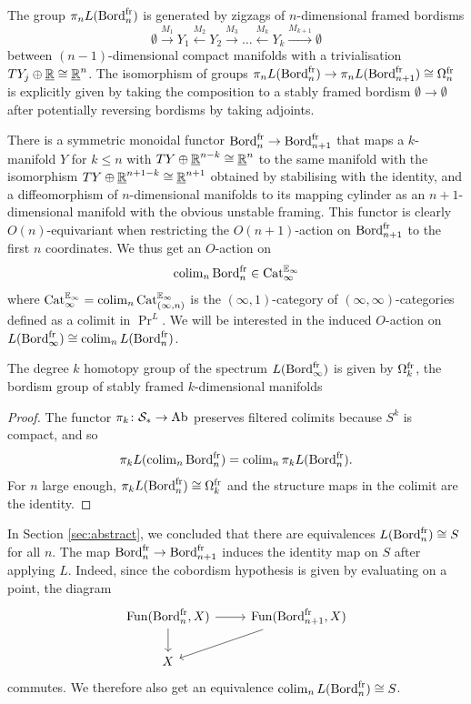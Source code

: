\documentclass{amsart}
\begin{document}
\begin{example}
    The group $\pi_n L(\operatorname{Bord}_n^{\mathrm{fr}})$ is generated by zigzags of $n$-dimensional framed bordisms
    \[
    \emptyset \xrightarrow{M_1} Y_1 \xleftarrow{M_2} Y_2 \xrightarrow{M_3} \dots \xleftarrow{M_{k}} Y_{k} \xrightarrow{M_{k+1}} \emptyset
    \]
    between $(n-1)$-dimensional compact manifolds with a trivialisation $TY_j \oplus \underline{\mathbb{R}} \cong \underline{\mathbb{R}}^n$.
    The isomorphism of groups $\pi_n L(\operatorname{Bord}_n^{\mathrm{fr}}) \to \pi_n L(\operatorname{Bord}_{n+1}^{\mathrm{fr}}) \cong \Omega_n^{\mathrm{fr}}$ is explicitly given by taking the composition to a stably framed bordism $\emptyset \to \emptyset$ after potentially reversing bordisms by taking adjoints.
\end{example}

There is a symmetric monoidal functor $\operatorname{Bord}^{\mathrm{fr}}_n \to \operatorname{Bord}^{\mathrm{fr}}_{n+1}$ that maps a $k$-manifold $Y$ for $k\leq n$ with $TY \oplus \underline{\mathbb{R}}^{n-k} \cong \underline{\mathbb{R}}^n$ to the same manifold with the isomorphism $TY \oplus \underline{\mathbb{R}}^{n+1-k} \cong \underline{\mathbb{R}}^{n+1}$ obtained by stabilising with the identity, and a diffeomorphism of $n$-dimensional manifolds to its mapping cylinder as an $n+1$-dimensional manifold with the obvious unstable framing.
This functor is clearly $O(n)$-equivariant when restricting the $O(n+1)$-action on $\operatorname{Bord}^{\mathrm{fr}}_{n+1}$ to the first $n$ coordinates.
We thus get an $O$-action on
\[
\operatorname{colim}_n \operatorname{Bord}^{\mathrm{fr}}_n \in \operatorname{Cat}^{\mathbb{E}_\infty}_\infty
\]
where $\operatorname{Cat}^{\mathbb{E}_\infty}_\infty = \operatorname{colim}_n \operatorname{Cat}^{\mathbb{E}_\infty}_{(\infty,n)}$ is the $(\infty,1)$-category of $(\infty,\infty)$-categories defined as a colimit in $\Pr^L$.
We will be interested in the induced $O$-action on $L(\operatorname{Bord}^{\mathrm{fr}}_\infty) \cong \operatorname{colim}_n L(\operatorname{Bord}^{\mathrm{fr}}_n)$.

\begin{lemma}\label{lem:bordism-colimit}
    The degree $k$ homotopy group of the spectrum $L(\operatorname{Bord}^{\mathrm{fr}}_\infty)$ is given by $\Omega^{\mathrm{fr}}_k$, the bordism group of stably framed $k$-dimensional manifolds
\end{lemma}
\begin{proof}
    The functor $\pi_k \colon \mathcal{S}_* \to \operatorname{Ab}$ preserves filtered colimits because $S^k$ is compact, and so 
    \[
    \pi_k L(\operatorname{colim}_n \operatorname{Bord}^{\mathrm{fr}}_n) = \operatorname{colim}_n \pi_k L(\operatorname{Bord}^{\mathrm{fr}}_n).
    \]
    For $n$ large enough, $\pi_k L(\operatorname{Bord}^{\mathrm{fr}}_n) \cong \Omega^{\mathrm{fr}}_k$ and the structure maps in the colimit are the identity.
\end{proof}


In Section \ref{sec:abstract}, we concluded that there are equivalences $L(\operatorname{Bord}^{\mathrm{fr}}_n) \cong S$ for all $n$.
The map $\operatorname{Bord}^{\mathrm{fr}}_n \to \operatorname{Bord}^{\mathrm{fr}}_{n+1}$ induces the identity map on $S$ after applying $L$.
Indeed, since the cobordism hypothesis is given by evaluating on a point, the diagram
\[
\begin{tikzcd}
    \Fun(\Bord^{\fr}_n,X) \ar[r] \ar[d] & \Fun(\Bord^{\fr}_{n+1}, X) \ar[dl]
    \\
    X &
\end{tikzcd}
\]
commutes.
We therefore also get an equivalence $\operatorname{colim}_n L(\operatorname{Bord}_n^{\mathrm{fr}}) \cong S$.
\end{document}
